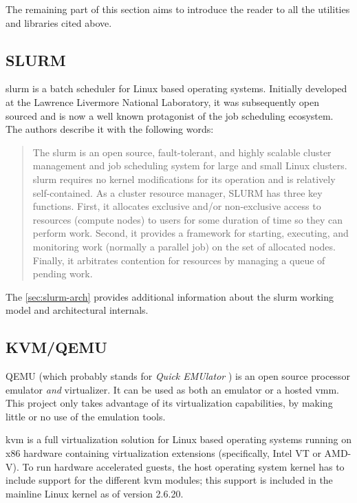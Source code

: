 The remaining part of this section aims to introduce the reader to all the utilities and libraries cited above.

\subsection*{SLURM}
\label{sec:slurm}

\gls{slurm} is a batch scheduler for Linux based operating systems. Initially developed at the Lawrence Livermore National Laboratory, it was subsequently open sourced and is now a well known protagonist of the job scheduling ecosystem. The authors \cite{slurm-www} describe it with the following words:

\begin{quote}
The \gls{slurm} is an open source, fault-tolerant, and highly scalable cluster management and job scheduling system for large and small Linux clusters. \gls{slurm} requires no kernel modifications for its operation and is relatively self-contained. As a cluster resource manager, SLURM has three key functions. First, it allocates exclusive and/or non-exclusive access to resources (compute nodes) to users for some duration of time so they can perform work. Second, it provides a framework for starting, executing, and monitoring work (normally a parallel job) on the set of allocated nodes. Finally, it arbitrates contention for resources by managing a queue of pending work.
\end{quote}

The \autoref{sec:slurm-arch} provides additional information about the \gls{slurm} working model and architectural internals.


\subsection*{KVM/QEMU}
\label{sec:kvm}

QEMU \cite{qemu-www} (which probably stands for \emph{Quick EMUlator} \cite{ubuntu-admin}) is an open source processor emulator \emph{and} virtualizer. It can be used as both an emulator or a hosted \gls{vmm}. This project only takes advantage of its virtualization capabilities, by making little or no use of the emulation tools.

\gls{kvm} \cite{kvm-www} is a full virtualization solution for Linux based operating systems running on x86 hardware containing virtualization extensions (specifically, Intel VT or AMD-V). To run hardware accelerated guests, the host operating system kernel has to include support for the different \gls{kvm} modules; this support is included in the mainline Linux kernel as of version 2.6.20.

